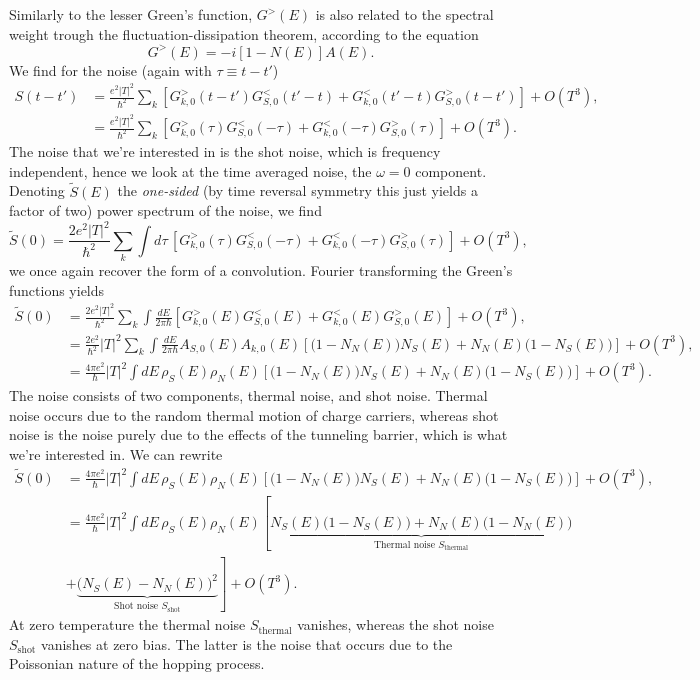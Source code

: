 Similarly to the lesser Green's function, $G^>(E)$ is also related to the spectral weight trough the fluctuation-dissipation theorem, according to the equation
\begin{equation}
    G^>(E) = -i[1-N(E)]A(E).
\end{equation}
We find for the noise (again with $\tau \equiv t-t'$)
\begin{align}\label{eq:autocorrelation}
    S(t-t') &= \frac{e^2|T|^2}{\hbar^2} \sum_k \left[G^>_{k,0}(t-t')G^<_{S,0}(t'-t) + G^<_{k,0}(t'-t)G^>_{S,0}(t-t')\right] + O(T^3),\\
    &= \frac{e^2|T|^2}{\hbar^2} \sum_k \left[G^>_{k,0}(\tau)G^<_{S,0}(-\tau) + G^<_{k,0}(-\tau)G^>_{S,0}(\tau)\right] + O(T^3).
\end{align}
The noise that we're interested in is the shot noise, which is frequency independent, hence we look at the time averaged noise, the $\omega = 0$ component. Denoting $\tilde{S}(E)$ the \textit{one-sided} (by time reversal symmetry this just yields a factor of two) power spectrum of the noise, we find
\begin{equation}
    \tilde{S}(0) = \frac{2e^2|T|^2}{\hbar^2} \sum_k \int d\tau \,\left[G^>_{k,0}(\tau)G^<_{S,0}(-\tau) + G^<_{k,0}(-\tau)G^>_{S,0}(\tau)\right] + O(T^3),
\end{equation}
we once again recover the form of a convolution. Fourier transforming the Green's functions yields
\begin{align}
    \tilde{S}(0) &= \frac{2e^2|T|^2}{\hbar^2} \sum_k \int \frac{dE}{2\pi\hbar} \left[G^>_{k,0}(E)G^<_{S,0}(E) + G^<_{k,0}(E)G^>_{S,0}(E)\right] + O(T^3),\\
    &= \frac{2e^2}{\hbar^2}|T|^2 \sum_k \int \frac{dE}{2\pi\hbar} A_{S,0}(E)A_{k,0}(E)\left[\bigl(1-N_N(E)\bigr)N_S(E)+N_N(E)\bigl(1-N_S(E)\bigr)\right] + O(T^3), \\
    &= \frac{4\pi e^2}{\hbar}|T|^2\int dE\,\rho_S(E)\rho_N(E)\left[\bigl(1-N_N(E)\bigr)N_S(E)+N_N(E)\bigl(1-N_S(E)\bigr)\right] + O(T^3).
\end{align}
The noise consists of two components, thermal noise, and shot noise. Thermal noise occurs due to the random thermal motion of charge carriers, whereas shot noise is the noise purely due to the effects of the tunneling barrier, which is what we're interested in. We can rewrite 
\begin{align}
    \tilde{S}(0)&=\frac{4\pi e^2}{\hbar}|T|^2\int dE\,\rho_S(E)\rho_N(E)\left[\bigl(1-N_N(E)\bigr)N_S(E)+N_N(E)\bigl(1-N_S(E)\bigr) \right] + O(T^3),\nonumber\\
    &=\frac{4\pi e^2}{\hbar}|T|^2\int dE\,\rho_S(E)\rho_N(E)\left[\underbrace{N_S(E)\bigl(1-N_S(E)\bigr) + N_N(E)\bigl(1-N_N(E)\bigr)}_{\text{Thermal noise }S_{\textrm{thermal}}} \nonumber\right. \\
    &\left. + \underbrace{\bigl(N_S(E) - N_N(E)\bigr)^2}_{\text{Shot noise } S_{\textrm{shot}}}\right] + O(T^3).
\end{align}
At zero temperature the thermal noise $S_{\textrm{thermal}}$ vanishes, whereas the shot noise $S_{\textrm{shot}}$ vanishes at zero bias. The latter is the noise that occurs due to the Poissonian nature of the hopping process. 


